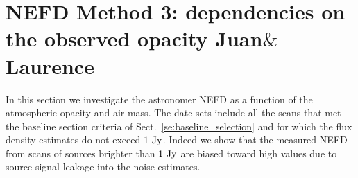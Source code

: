 
\section{NEFD Method 3: dependencies on the observed opacity {\color{blue} Juan$\&$Laurence}}
\label{NEFD_pipeline}

In this section we investigate the astronomer NEFD as a function of
the atmospheric opacity and air mass.            
The date sets include all the scans that met the baseline section
criteria of Sect.~\ref{se:baseline_selection} and for which the flux
density estimates do not exceed $1~\rm{Jy}$. Indeed we show that the
measured NEFD from scans of sources brighter than $1~\rm{Jy}$ are
biased toward high values due to source signal leakage into the noise
estimates.



